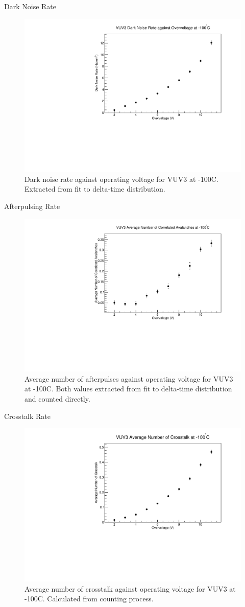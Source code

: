 \documentclass{beamer}
\begin{document}
\begin{frame}{Dark Noise Rate}
\begin{figure}
\centering
\includegraphics[height=0.5\textwidth]{VUV3_DN_vs_OV.pdf}
\caption{Dark noise rate against operating voltage for VUV3 at -100C. Extracted from fit to delta-time distribution.}
\end{figure}
\end{frame}

\begin{frame}{Afterpulsing Rate}
\begin{figure}
\centering
\includegraphics[height=0.5\textwidth]{VUV3_AP2_vs_OV.pdf}
\caption{Average number of afterpulses against operating voltage for VUV3 at -100C. Both values extracted from fit to delta-time distribution and counted directly.}
\end{figure}
\end{frame}

\begin{frame}{Crosstalk Rate}
\begin{figure}
\centering
\includegraphics[height=0.5\textwidth]{VUV3_CT_vs_OV.pdf}
\caption{Average number of crosstalk against operating voltage for VUV3 at -100C. Calculated from counting process.}
\end{figure}
\end{frame}
\end{document}
